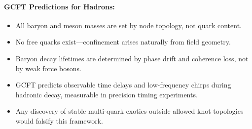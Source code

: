 \paragraph{GCFT Predictions for Hadrons:}
\begin{itemize}
  \item All baryon and meson masses are set by node topology, not quark content.
  \item No free quarks exist—confinement arises naturally from field geometry.
  \item Baryon decay lifetimes are determined by phase drift and coherence loss, not by weak force bosons.
  \item GCFT predicts observable time delays and low-frequency chirps during hadronic decay, measurable in precision timing experiments.
  \item Any discovery of stable multi-quark exotics outside allowed knot topologies would falsify this framework.
\end{itemize}
